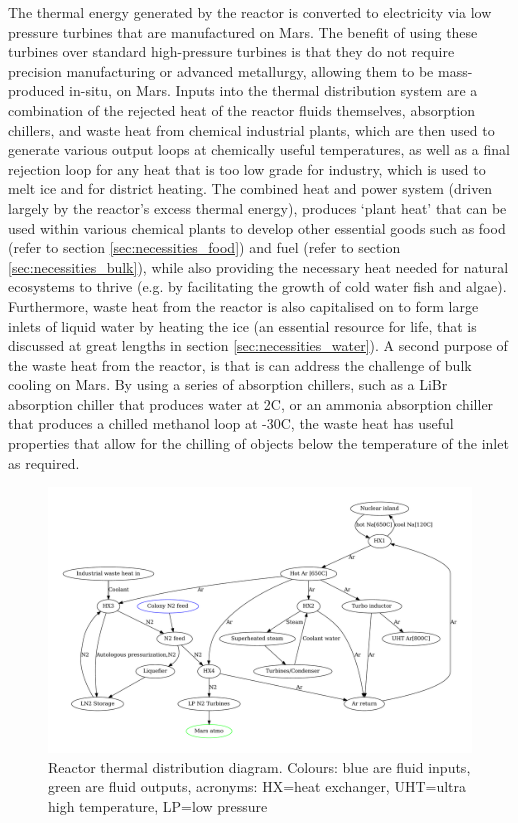 \documentclass[fleqn,10pt]{Stylesheet} %
\begin{document}
The thermal energy generated by the reactor is converted to electricity via low pressure turbines that are manufactured on Mars. The benefit of using these turbines over standard high-pressure turbines is that they do not require precision manufacturing or advanced metallurgy, allowing them to be mass-produced in-situ, on Mars. Inputs into the thermal distribution system are a combination of the rejected heat of the reactor fluids themselves, absorption chillers, and waste heat from chemical industrial plants, which are then used to generate various output loops at chemically useful temperatures, as well as a final rejection loop for any heat that is too low grade for industry, which is used to melt ice and for district heating. The combined heat and power system (driven largely by the reactor’s excess thermal energy), produces ‘plant heat’ that can be used within various chemical plants to develop other essential goods such as food (refer to section \ref{sec:necessities_food}) and fuel (refer to section \ref{sec:necessities_bulk}), while also providing the necessary heat needed for natural ecosystems to thrive (e.g. by facilitating the growth of cold water fish and algae). Furthermore, waste heat from the reactor is also capitalised on to form large inlets of liquid water by heating the ice (an essential resource for life, that is discussed at great lengths in section \ref{sec:necessities_water}). A second purpose of the waste heat from the reactor, is that is can address the challenge of bulk cooling on Mars. By using a series of absorption chillers, such as a LiBr absorption chiller that produces water at 2\degree{}C, or an ammonia absorption chiller that produces a chilled methanol loop at -30\degree{}C, the waste heat has useful properties that allow for the chilling of objects below the temperature of the inlet as required.

\begin{figure}
    \centering
    \includegraphics[width=\linewidth]{figures/fig_power.pdf}
    \caption{Reactor thermal distribution diagram. 
    Colours: blue are fluid inputs, green are fluid outputs, acronyms: HX=heat exchanger, UHT=ultra high temperature, LP=low pressure} 
    \label{fig:power_diagram}
\end{figure}
\end{document}
